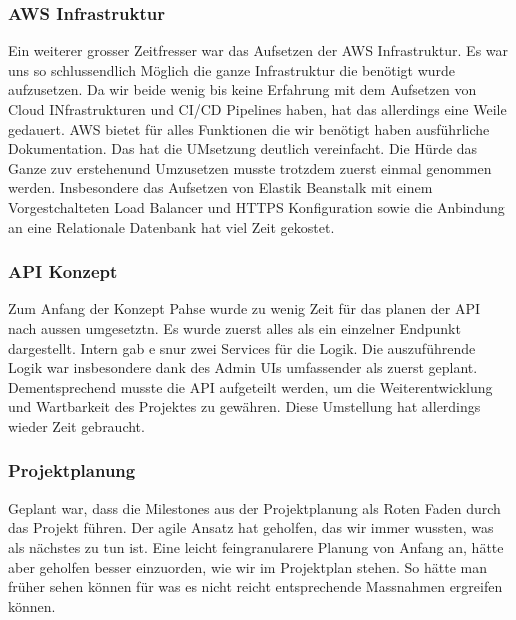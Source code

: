 \subsubsection*{AWS Infrastruktur}

Ein weiterer grosser Zeitfresser war das Aufsetzen der AWS Infrastruktur.
Es war uns so schlussendlich Möglich die ganze Infrastruktur die benötigt wurde aufzusetzen.
Da wir beide wenig bis keine Erfahrung mit dem Aufsetzen von Cloud INfrastrukturen und CI/CD Pipelines haben, hat das allerdings eine Weile gedauert.
AWS bietet für alles Funktionen die wir benötigt haben ausführliche Dokumentation.
Das hat die UMsetzung deutlich vereinfacht.
Die Hürde das Ganze zuv erstehenund Umzusetzen musste trotzdem zuerst einmal genommen werden.
Insbesondere das Aufsetzen von Elastik Beanstalk mit einem Vorgestchalteten Load Balancer und HTTPS Konfiguration sowie die Anbindung an eine Relationale Datenbank hat viel Zeit gekostet.

\subsubsection*{API Konzept}

Zum Anfang der Konzept Pahse wurde zu wenig Zeit für das planen der API nach aussen umgesetztn.
Es wurde zuerst alles als ein einzelner Endpunkt dargestellt.
Intern gab e snur zwei Services für die Logik.
Die auszuführende Logik war insbesondere dank des Admin UIs umfassender als zuerst geplant.
Dementsprechend musste die API aufgeteilt werden, um die Weiterentwicklung und Wartbarkeit des Projektes zu gewähren.
Diese Umstellung hat allerdings wieder Zeit gebraucht.


\subsubsection*{Projektplanung}

Geplant war, dass die Milestones aus der Projektplanung als Roten Faden durch das Projekt führen.
Der agile Ansatz hat geholfen, das wir immer wussten, was als nächstes zu tun ist.
Eine leicht feingranularere Planung von Anfang an, hätte aber geholfen besser einzuorden, wie wir im Projektplan stehen.
So hätte man früher sehen können für was es nicht reicht entsprechende Massnahmen ergreifen können.

